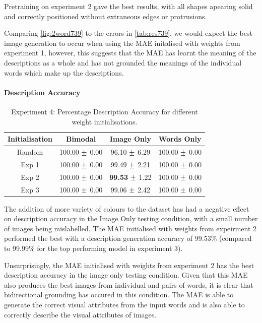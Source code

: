 Pretraining on experiment 2 gave the best results, with all shapes apearing solid and correctly positioned without extraneous edges or protrusions. 

Comparing \autoref{fig:2word739} to the errors in \autoref{tab:res739}, we would expect the best image generation to occur when using the \ac{MAE} initalised with weights from experiment 1, however, this suggests that the \ac{MAE} has learnt the meaning of the descriptions as a whole and has not grounded the meanings of the individual words which make up the descriptions.

\paragraph{Description Accuracy}


\begin{table}[h!]
\centering
	\begin{tabular}{|c|c|c|c|}
	\hline
	\textbf{Initialisation} & 	\textbf{Bimodal} & 	\textbf{Image Only} 	& 	\textbf{Words Only} \\ \hline
Random 	&	100.00	$\mypm$	0.00	&	96.10	$\mypm$	6.29	&	100.00	$\mypm$	0.00	\\ \hline
Exp 1	&	100.00	$\mypm$	0.00	&	99.49	$\mypm$	2.21	&	100.00	$\mypm$	0.00	\\ \hline
Exp 2	&	100.00	$\mypm$	0.00	&	\textbf{99.53}	$\mypm$	1.22	&	100.00	$\mypm$	0.00\\ \hline
Exp 3	&	100.00	$\mypm$	0.00	&	99.06	$\mypm$	2.42	&	100.00	$\mypm$	0.00\\ \hline

	\end{tabular}
\caption{Experiment 4: Percentage Description Accuracy for different weight initialisations.}
\label{tab:res739acc}
\end{table}

The addition of more variety of colours to the dataset has had a negative effect on description accuracy in the Image Only testing condition, with a small number of images being mislabelled. The \ac{MAE} initialised with weights from expeirment 2 performed the best with a description generation accuracy of 99.53\% (compared to 99.99\% for the top performing model in experiment 3).

Unsurprisingly, the \ac{MAE} initialised with weights from experiment 2 has the best description accuracy in the image only testing condition. Given that this \ac{MAE} also produces the best images from individual and pairs of words, it is clear that bidirectional grounding has occured in this condition. The \ac{MAE} is able to generate the correct visual attributes from the input words and is also able to correctly describe the visual attributes of images.

